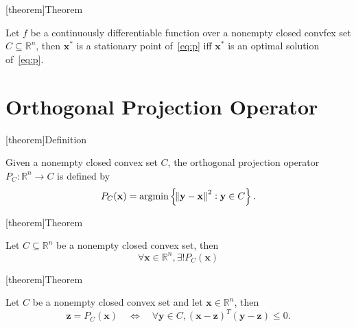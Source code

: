 \documentclass[12pt]{report}
\theoremstyle{definition}
\begin{document}
[theorem]{Theorem}
\begin{stationarity in convex optimization}
    Let $f$ be a continuously differentiable function over a nonempty closed
    convfex set $C\subseteq\mathbb{R}^{n}$, then $\mathbf{x}^*$ is a stationary
    point of~\eqref{eq:p} iff $\mathbf{x}^*$ is an optimal solution
    of~\eqref{eq:p}.
\end{stationarity in convex optimization}

\section{Orthogonal Projection Operator}

[theorem]{Definition}
\begin{orthogonal projection}
    Given a nonempty closed convex set $C$, the orthogonal projection operator
    $P_C:\mathbb{R}^{n}\rightarrow C$ is defined by
    \[
        P_C(\mathbf{x})=\text{argmin}\left\{\norm{\mathbf{y}-\mathbf{x}}^2:\mathbf{y}\in
        C\right\}.
    \]
\end{orthogonal projection}

[theorem]{Theorem}
\begin{1 projection theorem}
    Let $C\subseteq\mathbb{R}^{n}$ be a nonempty closed convex set, then
    \[
        \forall \mathbf{x}\in\mathbb{R}^{n},
        \exists ! P_C(\mathbf{x})
    \]
    
\end{1 projection theorem}

[theorem]{Theorem}
\begin{2 projection theorem}
    Let $C$ be a nonempty closed convex set and let
    $\mathbf{x}\in\mathbb{R}^{n}$, then
    \[
        \mathbf{z}=P_C(\mathbf{x})
        \quad\iff\quad
        \forall \mathbf{y}\in C,
        (\mathbf{x}-\mathbf{z})^T(\mathbf{y}-\mathbf{z})\le 0.
    \]
    
\end{2 projection theorem}
\end{document}
